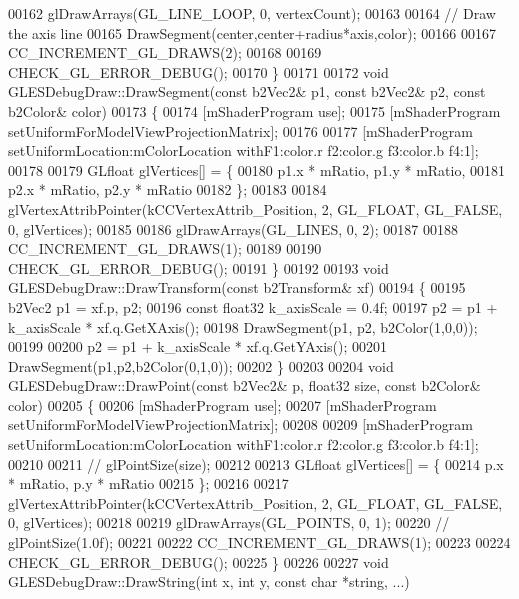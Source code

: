 \begin{DoxyCode}
00162     glDrawArrays(GL\_LINE\_LOOP, 0, vertexCount);
00163 
00164     \textcolor{comment}{// Draw the axis line}
00165     DrawSegment(center,center+radius*axis,color);
00166 
00167     CC\_INCREMENT\_GL\_DRAWS(2);
00168 
00169     CHECK\_GL\_ERROR\_DEBUG();
00170 \}
00171 
00172 \textcolor{keywordtype}{void} GLESDebugDraw::DrawSegment(\textcolor{keyword}{const} b2Vec2& p1, \textcolor{keyword}{const} b2Vec2& p2, \textcolor{keyword}{const} b2Color& color)
00173 \{
00174     [mShaderProgram use];
00175     [mShaderProgram setUniformForModelViewProjectionMatrix];
00176 
00177     [mShaderProgram setUniformLocation:mColorLocation withF1:color.r f2:color.g f3:color.b f4:1];
00178 
00179     GLfloat             glVertices[] = \{
00180         p1.x * mRatio, p1.y * mRatio,
00181         p2.x * mRatio, p2.y * mRatio
00182     \};
00183 
00184     glVertexAttribPointer(kCCVertexAttrib\_Position, 2, GL\_FLOAT, GL\_FALSE, 0, glVertices);
00185 
00186     glDrawArrays(GL\_LINES, 0, 2);
00187     
00188     CC\_INCREMENT\_GL\_DRAWS(1);
00189 
00190     CHECK\_GL\_ERROR\_DEBUG();
00191 \}
00192 
00193 \textcolor{keywordtype}{void} GLESDebugDraw::DrawTransform(\textcolor{keyword}{const} b2Transform& xf)
00194 \{
00195     b2Vec2 p1 = xf.p, p2;
00196     \textcolor{keyword}{const} float32 k\_axisScale = 0.4f;
00197     p2 = p1 + k\_axisScale * xf.q.GetXAxis();
00198     DrawSegment(p1, p2, b2Color(1,0,0));
00199 
00200     p2 = p1 + k\_axisScale * xf.q.GetYAxis();
00201     DrawSegment(p1,p2,b2Color(0,1,0));
00202 \}
00203 
00204 \textcolor{keywordtype}{void} GLESDebugDraw::DrawPoint(\textcolor{keyword}{const} b2Vec2& p, float32 size, \textcolor{keyword}{const} b2Color& color)
00205 \{
00206     [mShaderProgram use];
00207     [mShaderProgram setUniformForModelViewProjectionMatrix];
00208 
00209     [mShaderProgram setUniformLocation:mColorLocation withF1:color.r f2:color.g f3:color.b f4:1];
00210 
00211 \textcolor{comment}{//  glPointSize(size);}
00212 
00213     GLfloat             glVertices[] = \{
00214         p.x * mRatio, p.y * mRatio
00215     \};
00216 
00217     glVertexAttribPointer(kCCVertexAttrib\_Position, 2, GL\_FLOAT, GL\_FALSE, 0, glVertices);
00218 
00219     glDrawArrays(GL\_POINTS, 0, 1);
00220 \textcolor{comment}{//  glPointSize(1.0f);}
00221     
00222     CC\_INCREMENT\_GL\_DRAWS(1);
00223 
00224     CHECK\_GL\_ERROR\_DEBUG();
00225 \}
00226 
00227 \textcolor{keywordtype}{void} GLESDebugDraw::DrawString(\textcolor{keywordtype}{int} x, \textcolor{keywordtype}{int} y, \textcolor{keyword}{const} \textcolor{keywordtype}{char} *\textcolor{keywordtype}{string}, ...)

\end{DoxyCode}
